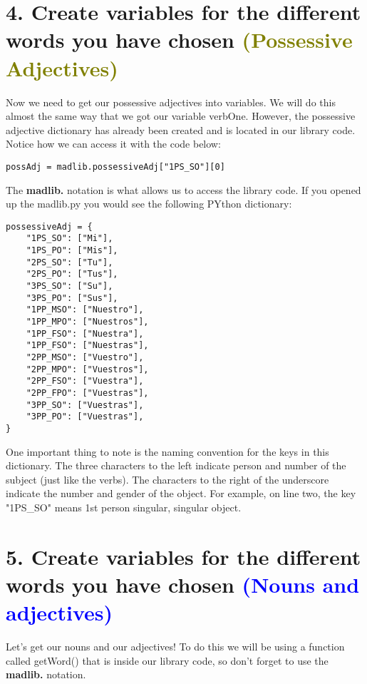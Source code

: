 \documentclass[a4paper,11pt]{article}
\theoremstyle{mytheor}
\begin{document}
\section*{4. Create variables for the different words you have chosen \textcolor{olive}{(Possessive Adjectives)}}

Now we need to get our possessive adjectives into variables. We will do this almost the same way that we got our variable verbOne. 
However, the possessive adjective dictionary has already been created and is located in our library code. Notice how we can access it with the code below:

\begin{lstlisting}[label={list:second},caption=Add this to the bottom of your code]
possAdj = madlib.possessiveAdj["1PS_SO"][0]
\end{lstlisting}
The \textbf{madlib.} notation is what allows us to access the library code. If you opened up the madlib.py you would see the following PYthon dictionary:

\begin{lstlisting}[label={list:second},caption=Dictionary for possessive adjectives (located in library code)]
possessiveAdj = {
    "1PS_SO": ["Mi"],
    "1PS_PO": ["Mis"],
    "2PS_SO": ["Tu"],
    "2PS_PO": ["Tus"],
    "3PS_SO": ["Su"],
    "3PS_PO": ["Sus"],
    "1PP_MSO": ["Nuestro"],
    "1PP_MPO": ["Nuestros"],
    "1PP_FSO": ["Nuestra"],
    "1PP_FSO": ["Nuestras"],
    "2PP_MSO": ["Vuestro"],
    "2PP_MPO": ["Vuestros"],
    "2PP_FSO": ["Vuestra"],
    "2PP_FPO": ["Vuestras"],
    "3PP_SO": ["Vuestras"],
    "3PP_PO": ["Vuestras"],
}
\end{lstlisting}
One important thing to note is the naming convention for the keys in this dictionary. 
The three characters to the left indicate person and number of the subject (just like the verbs). 
The characters to the right of the underscore indicate the number and gender of the object.\newline 
\newline
For example, on line two, the key "1PS\_SO" means 1st person singular, singular object.

\section*{5. Create variables for the different words you have chosen \textcolor{blue}{(Nouns and adjectives)}}

Let's get our nouns and our adjectives! To do this we will be using a function called getWord() that is inside our library code, so don't forget to use the \textbf{madlib.} notation.
\end{document}
